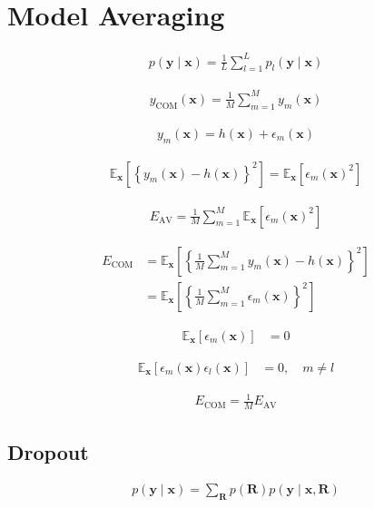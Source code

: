 \documentclass{article}
\begin{document}
\section{Model Averaging}

\begin{align*}
p(\mathbf{y} \mid \mathbf{x})=\frac{1}{L} \sum_{l=1}^{L} p_{l}(\mathbf{y} \mid \mathbf{x}) \tag{9.42}
\end{align*}

\begin{align*}
y_{\mathrm{COM}}(\mathbf{x})=\frac{1}{M} \sum_{m=1}^{M} y_{m}(\mathbf{x}) \tag{9.43}
\end{align*}

\begin{align*}
y_{m}(\mathbf{x})=h(\mathbf{x})+\epsilon_{m}(\mathbf{x}) \tag{9.44}
\end{align*}

\begin{align*}
\mathbb{E}_{\mathbf{x}}\left[
\left\{y_{m}(\mathbf{x})-h(\mathbf{x})\right\}^{2}\right]
=\mathbb{E}_{\mathbf{x}}\left[
\epsilon_{m}(\mathbf{x})^{2}\right]
\tag{9.45}
\end{align*}

\begin{align*}
E_{\mathrm{AV}}=\frac{1}{M} \sum_{m=1}^{M} \mathbb{E}_{\mathbf{x}}\left[
\epsilon_{m}(\mathbf{x})^{2}\right]
\tag{9.46}
\end{align*}

\begin{align*}
E_{\mathrm{COM}} & =\mathbb{E}_{\mathbf{x}}\left[
\left\{\frac{1}{M} \sum_{m=1}^{M} y_{m}(\mathbf{x})-h(\mathbf{x})\right\}^{2}\right] \\
& =\mathbb{E}_{\mathbf{x}}\left[
\left\{\frac{1}{M} \sum_{m=1}^{M} \epsilon_{m}(\mathbf{x})\right\}^{2}\right]
\tag{9.47}
\end{align*}

\begin{align*}
\mathbb{E}_{\mathbf{x}}\left[
\epsilon_{m}(\mathbf{x})\right]
& =0  \tag{9.48}
\end{align*}

\begin{align*}
\mathbb{E}_{\mathbf{x}}\left[
\epsilon_{m}(\mathbf{x}) \epsilon_{l}(\mathbf{x})\right]
& =0, \quad m \neq l
\tag{9.49}
\end{align*}

\begin{align*}
E_{\mathrm{COM}}=\frac{1}{M} E_{\mathrm{AV}} \tag{9.50}
\end{align*}

\subsection{Dropout}

\begin{align*}
p(\mathbf{y} \mid \mathbf{x})=\sum_{\mathbf{R}} p(\mathbf{R}) p(\mathbf{y} \mid \mathbf{x}, \mathbf{R}) \tag{9.51}
\end{align*}
\end{document}
